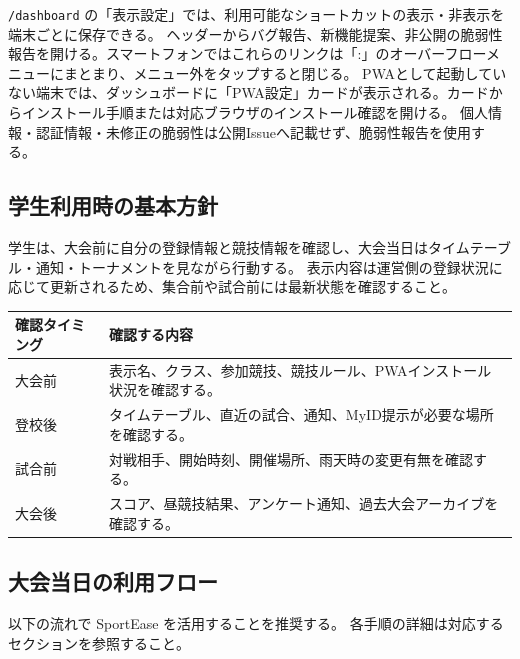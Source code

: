 \documentclass[12pt]{ltjsarticle}
\newcommand{\code}[1]{\colorbox{gray!20}{\texttt{#1}}}
\begin{document}
\code{/dashboard} の「表示設定」では、利用可能なショートカットの表示・非表示を端末ごとに保存できる。
ヘッダーからバグ報告、新機能提案、非公開の脆弱性報告を開ける。スマートフォンではこれらのリンクは「:」のオーバーフローメニューにまとまり、メニュー外をタップすると閉じる。
PWAとして起動していない端末では、ダッシュボードに「PWA設定」カードが表示される。カードからインストール手順または対応ブラウザのインストール確認を開ける。
個人情報・認証情報・未修正の脆弱性は公開Issueへ記載せず、脆弱性報告を使用する。

\subsection{学生利用時の基本方針}

学生は、大会前に自分の登録情報と競技情報を確認し、大会当日はタイムテーブル・通知・トーナメントを見ながら行動する。
表示内容は運営側の登録状況に応じて更新されるため、集合前や試合前には最新状態を確認すること。

\begin{center}
\begin{tabular}{p{4cm}p{9cm}}
\toprule
\textbf{確認タイミング} & \textbf{確認する内容} \\
\midrule
大会前 & 表示名、クラス、参加競技、競技ルール、PWAインストール状況を確認する。 \\
\midrule
登校後 & タイムテーブル、直近の試合、通知、MyID提示が必要な場所を確認する。 \\
\midrule
試合前 & 対戦相手、開始時刻、開催場所、雨天時の変更有無を確認する。 \\
\midrule
大会後 & スコア、昼競技結果、アンケート通知、過去大会アーカイブを確認する。 \\
\bottomrule
\end{tabular}
\end{center}

\subsection{大会当日の利用フロー}

以下の流れで SportEase を活用することを推奨する。
各手順の詳細は対応するセクションを参照すること。
\end{document}
